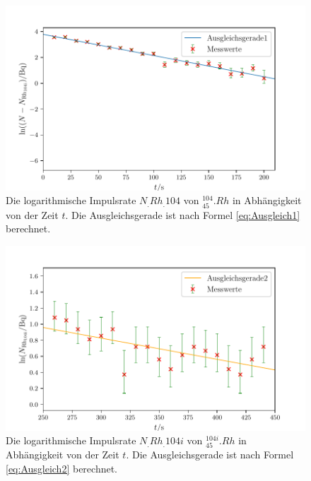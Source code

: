 \begin{figure}
	\centering
	\includegraphics[width=\linewidth-50pt,height=\textheight-50pt,keepaspectratio]{content/images/RhodiumLog1.pdf}
	\caption{Die logarithmische Impulsrate $N_.{Rh_.{104}}$ von $^{104}_{45}.{Rh}$ in Abhängigkeit von der Zeit $t$. Die Ausgleichsgerade ist nach Formel \eqref{eq:Ausgleich1} berechnet.}
	\label{fig:RhodiumLog1}
\end{figure}

\begin{figure}
	\centering
	\includegraphics[width=\linewidth-50pt,height=\textheight-50pt,keepaspectratio]{content/images/RhodiumLog2.pdf}
	\caption{Die logarithmische Impulsrate $N_.{Rh_.{104i}}$ von $^{104i}_{45}.{Rh}$ in Abhängigkeit von der Zeit $t$. Die Ausgleichsgerade ist nach Formel \eqref{eq:Ausgleich2} berechnet.}
	\label{fig:RhodiumLog2}
\end{figure}

